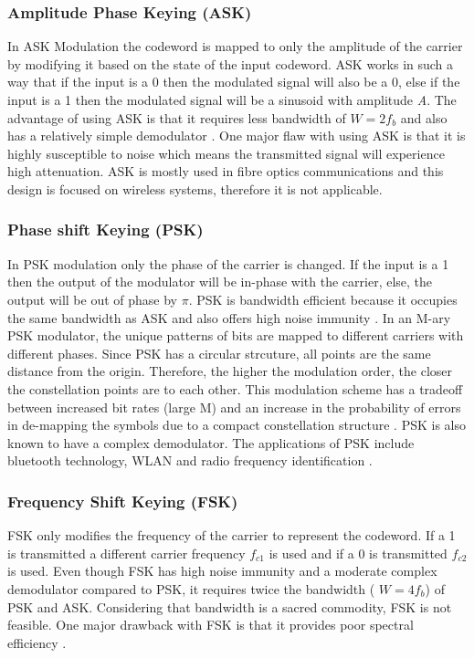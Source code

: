 \documentclass[pdftex,11pt,a4paper]{article}
\begin{document}
\subsubsection{Amplitude Phase Keying (ASK)}
In ASK Modulation the codeword is mapped to only the amplitude of the carrier by modifying it based on the state of the input codeword. ASK works in such a way that if the input is a 0 then the modulated signal will also be a 0, else if the input is a 1 then the modulated signal will be a sinusoid with amplitude \textit{A}. The advantage of using ASK is that it requires less bandwidth of \(W = 2f_b\) and also has a relatively simple demodulator \cite{61_}. One major flaw with using ASK is that it is highly susceptible to noise which means the transmitted signal will experience high attenuation.  ASK is mostly used in fibre optics communications and this design is focused on wireless systems, therefore it is not applicable. 



\subsubsection{Phase shift Keying (PSK)}
In PSK modulation only the phase of the carrier is changed. If the input is a 1 then the output of the modulator will be in-phase with the carrier, else, the output will be out of phase by $\pi$. PSK is bandwidth efficient because it occupies the same bandwidth as ASK and also offers high noise immunity \cite{61_}. In an M-ary PSK modulator, the unique patterns of bits are mapped to different carriers with different phases. Since PSK has a circular strcuture, all points are the same distance from the origin. Therefore, the higher the modulation order, the closer the constellation points are to each other. This modulation scheme has a tradeoff between increased bit rates (large M) and an increase in the probability of errors in  de-mapping the symbols due to a compact constellation structure \cite{unknownBook}. PSK is also known to have a complex demodulator. The applications of PSK include bluetooth technology, WLAN and radio frequency identification \cite{64}.

\subsubsection{Frequency Shift Keying (FSK)}
FSK only modifies the frequency of the carrier to represent the codeword. If a 1 is transmitted a different carrier frequency \(f_{c1}\) is used and if a 0 is transmitted \(f_{c2}\) is used. Even though FSK has high noise immunity and a moderate complex demodulator compared to PSK, it requires twice the bandwidth (
\(W = 4f_b\)) of PSK and ASK. Considering that bandwidth is a sacred commodity, FSK is not feasible. One major drawback with FSK is that it provides poor spectral efficiency \cite{smith}.
\end{document}
